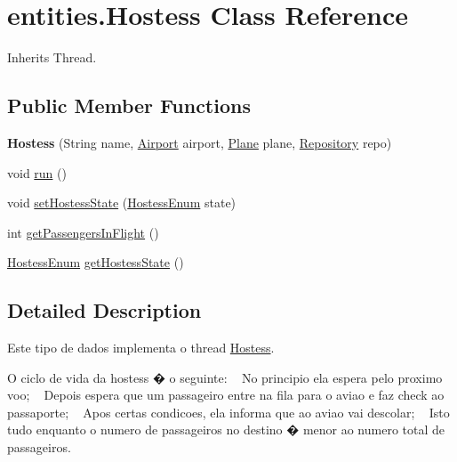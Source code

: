 \hypertarget{classentities_1_1_hostess}{}\section{entities.\+Hostess Class Reference}
\label{classentities_1_1_hostess}


Inherits Thread.

\subsection*{Public Member Functions}
\begin{DoxyCompactItemize}
\item 
\mbox{\label{classentities_1_1_hostess_af5fd5cb79ab98e980c15cd09d3576801}} 
{\bfseries Hostess} (String name, \hyperlink{classshared_regions_1_1_airport}{Airport} airport, \hyperlink{classshared_regions_1_1_plane}{Plane} plane, \hyperlink{classshared_regions_1_1_repository}{Repository} repo)
\item 
void \hyperlink{classentities_1_1_hostess_a509c1f1c96b0a760860884592c7babd8}{run} ()
\item 
void \hyperlink{classentities_1_1_hostess_ade5532fba6e9d58853c575ded4006507}{set\+Hostess\+State} (\hyperlink{enumentities_1_1_hostess_enum}{Hostess\+Enum} state)
\item 
int \hyperlink{classentities_1_1_hostess_af9d14239c4536df5a3975700d4c853fb}{get\+Passengers\+In\+Flight} ()
\item 
\hyperlink{enumentities_1_1_hostess_enum}{Hostess\+Enum} \hyperlink{classentities_1_1_hostess_acee3f8042f80e5252e6ed73255117d4e}{get\+Hostess\+State} ()
\end{DoxyCompactItemize}


\subsection{Detailed Description}
Este tipo de dados implementa o thread \hyperlink{classentities_1_1_hostess}{Hostess}.

O ciclo de vida da hostess � o seguinte\+: ~\newline
 No principio ela espera pelo proximo voo; ~\newline
 Depois espera que um passageiro entre na fila para o aviao e faz check ao passaporte; ~\newline
 Apos certas condicoes, ela informa que ao aviao vai descolar; ~\newline
 Isto tudo enquanto o numero de passageiros no destino � menor ao numero total de passageiros. 

